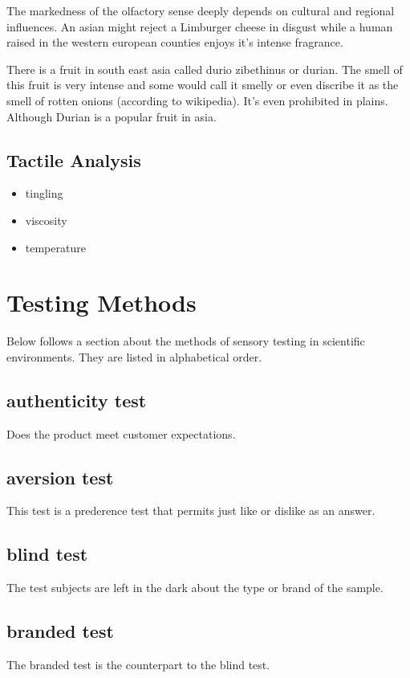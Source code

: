 \documentclass[]{scrartcl}
\begin{document}
The markedness of the olfactory sense deeply depends on cultural and regional influences.
An asian might reject a Limburger cheese in disgust while a human raised in the western european
counties enjoys it's intense fragrance.

There is a fruit in south east asia called durio zibethinus or durian.
The smell of this fruit is very intense and some would call it smelly or even discribe
it as the smell of rotten onions (according to wikipedia). It's even prohibited
in plains. Although Durian is a popular fruit in asia.

\subsection{Tactile Analysis}
\begin{itemize}
  \item tingling
  \item viscosity
  \item temperature
\end{itemize}


\section{Testing Methods}
Below follows a section about the methods of sensory testing in scientific environments.
They are listed in alphabetical order.
\subsection{authenticity test}
Does the product meet customer expectations.

\subsection{aversion test}
This test is a prederence test that permits just like or dislike as an answer.

\subsection{blind test}
The test subjects are left in the dark about the type or brand of the sample.

\subsection{branded test}
The branded test is the counterpart to the blind test.
\end{document}
